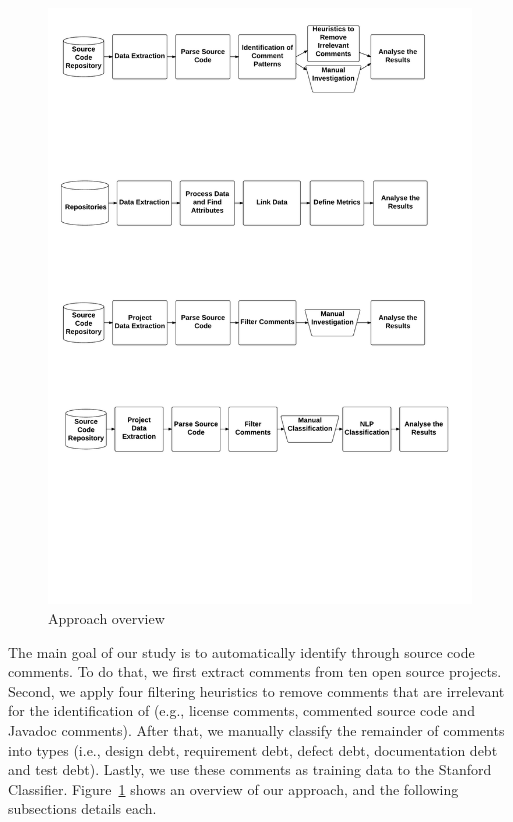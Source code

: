 \begin{figure}[thb!]
  \centering
  \includegraphics[width=1\textwidth]{figures/approach.pdf}
  \caption{Approach overview}
  \label{fig:approach}
\end{figure}

The main goal of our study is to automatically identify \SATD through source code comments. To do that, we first extract comments from ten open source projects. Second, we apply four filtering heuristics to remove comments that are irrelevant for the identification of \SATD  (e.g., license comments, commented source code and Javadoc comments). After that, we manually classify the remainder of comments into \SATD types (i.e., design debt, requirement debt, defect debt, documentation debt and test debt). Lastly, we use these comments as training data to the Stanford  Classifier. Figure~\ref{fig:approach} shows an overview of our approach, and the following subsections details each.

